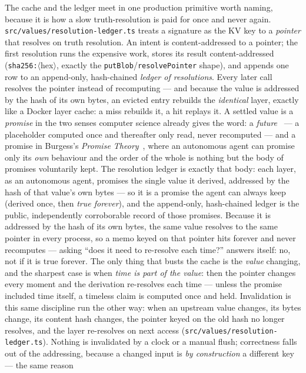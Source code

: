 \documentclass[11pt]{article}
\begin{document}
The cache and the ledger meet in one production primitive worth naming, because it is
how a slow truth-resolution is paid for once and never again.
\texttt{src/values/resolution-ledger.ts} treats a signature as the KV key to a
\emph{pointer} that resolves on truth resolution. An intent is content-addressed to a
pointer; the first resolution runs the expensive work, stores its result content-addressed
(\texttt{sha256:}$\langle$hex$\rangle$, exactly the \texttt{putBlob}/\texttt{resolvePointer}
shape), and appends one row to an append-only, hash-chained \emph{ledger of resolutions}.
Every later call resolves the pointer instead of recomputing --- and because the value is
addressed by the hash of its own bytes, an evicted entry rebuilds the \emph{identical}
layer, exactly like a Docker layer cache: a miss rebuilds it, a hit replays it.
A settled value is a \emph{promise} in the two senses computer science already gives the
word: a \emph{future}~\cite{futures} --- a placeholder computed once and thereafter only
read, never recomputed --- and a promise in Burgess's \emph{Promise Theory}~\cite{promisetheory},
where an autonomous agent can promise only its \emph{own} behaviour and the order of the
whole is nothing but the body of promises voluntarily kept. The resolution ledger is exactly
that body: each layer, as an autonomous agent, promises the single value it derived, addressed
by the hash of that value's own bytes --- so it is a promise the agent can always keep (derived
once, then \emph{true forever}), and the append-only, hash-chained ledger is the public,
independently corroborable record of those promises. Because it
is addressed by the hash of its own bytes, the same value resolves to the same pointer
in every process, so a memo keyed on that pointer hits forever and never recomputes ---
asking ``does it need to re-resolve each time?'' answers itself: no, not if it is true
forever. The only thing that busts the cache is the \emph{value} changing, and the
sharpest case is when \emph{time is part of the value}: then the pointer changes every
moment and the derivation re-resolves each time --- unless the promise included time
itself, a timeless claim is computed once and held. Invalidation is this same
discipline run the other way: when an upstream value changes, its bytes change, its
content hash changes, the pointer keyed on the old hash no longer resolves, and the
layer re-resolves on next access (\texttt{src/values/resolution-ledger.ts}). Nothing is
invalidated by a clock or a manual flush; correctness falls out of the addressing,
because a changed input is \emph{by construction} a different key --- the same reason
\end{document}
